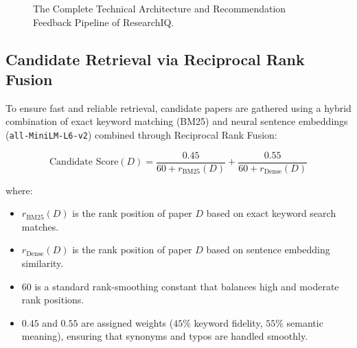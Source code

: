 \documentclass[11pt,a4paper]{article}
\begin{document}
\begin{figure}[H]
\caption{The Complete Technical Architecture and Recommendation Feedback Pipeline of ResearchIQ.}
\label{fig:two_stage_architecture}
\end{figure}

\subsection{Candidate Retrieval via Reciprocal Rank Fusion}
To ensure fast and reliable retrieval, candidate papers are gathered using a hybrid combination of exact keyword matching (BM25) and neural sentence embeddings (\texttt{all-MiniLM-L6-v2}) combined through Reciprocal Rank Fusion:

\begin{equation}
\text{Candidate Score}(D) = \frac{0.45}{60 + r_{\text{BM25}}(D)} + \frac{0.55}{60 + r_{\text{Dense}}(D)}
\end{equation}

\noindent where:
\begin{itemize}[leftmargin=1.5em]
    \item $r_{\text{BM25}}(D)$ is the rank position of paper $D$ based on exact keyword search matches.
    \item $r_{\text{Dense}}(D)$ is the rank position of paper $D$ based on sentence embedding similarity.
    \item $60$ is a standard rank-smoothing constant that balances high and moderate rank positions.
    \item $0.45$ and $0.55$ are assigned weights ($45\%$ keyword fidelity, $55\%$ semantic meaning), ensuring that synonyms and typos are handled smoothly.
\end{itemize}
\end{document}
